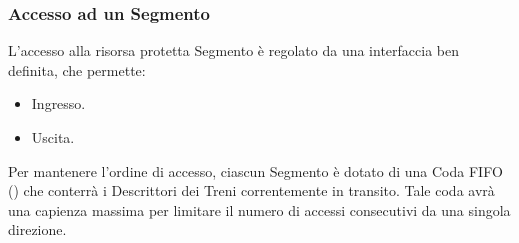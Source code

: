 	
		\subsubsection{Accesso ad un Segmento}
		
		L'accesso alla risorsa protetta Segmento è regolato da una interfaccia ben definita, che permette:
			\begin{itemize}
				\item Ingresso.
				\item Uscita.
			\end{itemize}
		Per mantenere l'ordine di accesso, ciascun Segmento è dotato di una Coda FIFO () che conterrà i Descrittori dei Treni correntemente in transito. Tale coda avrà una capienza massima per limitare il numero di accessi consecutivi da una singola direzione.
		
